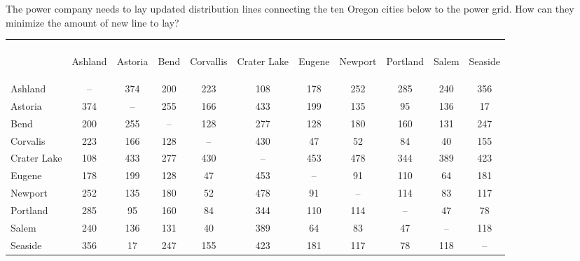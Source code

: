 \begin{example}{}{} %
The power company needs to lay updated distribution lines connecting the ten Oregon cities below to the power grid.  How can they minimize the amount of new line to lay?
 
\begin{center}
\begin{tabular}{|l|c|c|c|c|c|c|c|c|c|c|}
\hline
&&&&&&&&&&\\[7ex]
& \begin{rotate}{90}Ashland \end{rotate}& \begin{rotate}{90}Astoria\end{rotate}  & \begin{rotate}{90}Bend \end{rotate}& \begin{rotate}{90}Corvallis \end{rotate} & \begin{rotate}{90}Crater Lake \end{rotate} &  \begin{rotate}{90}Eugene  \end{rotate}&  \begin{rotate}{90}Newport \end{rotate} &  \begin{rotate}{90}Portland  \end{rotate}& \begin{rotate}{90}Salem \end{rotate} &  \begin{rotate}{90}Seaside \end{rotate}\\
\hline
Ashland & --&374&200&223&108&178&252&285&240&356\\
\hline
Astoria & 374&--&255&166&433&199&135&95&136&17\\
\hline
Bend & 200 & 255 &--&128&277&128&180 & 160&131&247\\
\hline
Corvalis&223&166&128&--&430&47&52&84&40&155\\
\hline
Crater Lake &108&433&277&430&--&453&478&344&389&423\\
\hline
Eugene &178&199&128&47&453&--&91&110&64&181\\
\hline
Newport&252&135&180&52&478&91&--&114&83&117\\
\hline
Portland &285&95&160&84&344&110&114&--&47&78\\
\hline
Salem & 240 &136&131&40&389&64&83&47&--&118\\
\hline
Seaside&356&17&247&155&423&181&117&78&118&--\\
\hline
\end{tabular}
\end{center}


\end{example}
